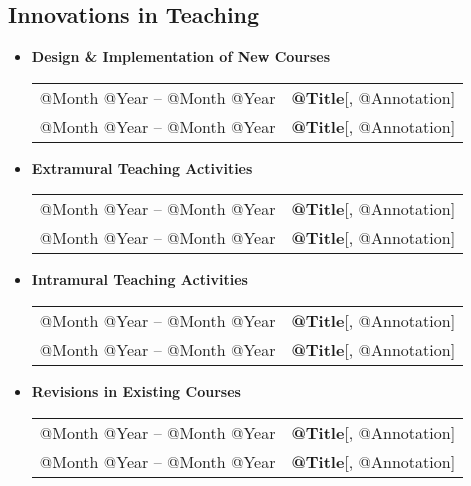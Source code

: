 \documentclass[10pt]{article}
\begin{document}
\begin{IOWA ONLY}
\subsection*{Innovations in Teaching}
\smallskip

\begin{itemize}
\item[] \textbf{Design \& Implementation of New Courses}
\\[1.3ex]
\begin{tabular}{l@{\quad\ }p{35em}} 
 @Month @Year -- @Month @Year
 & {\bf @Title}[, @Annotation]
 \\[.5ex]
 @Month @Year -- @Month @Year
 & {\bf @Title}[, @Annotation]
 \\[.5ex]
\end{tabular}

\item[] \textbf{Extramural Teaching Activities}
\\[1.3ex]
\begin{tabular}{l@{\quad\ }p{35em}} 
 @Month @Year -- @Month @Year
 & {\bf @Title}[, @Annotation]
 \\[.5ex]
 @Month @Year -- @Month @Year
 & {\bf @Title}[, @Annotation]
 \\[.5ex]
\end{tabular}

\item[] \textbf{Intramural Teaching Activities}
\\[1.3ex]
\begin{tabular}{l@{\quad\ }p{35em}} 
 @Month @Year -- @Month @Year
 & {\bf @Title}[, @Annotation]
 \\[.5ex]
 @Month @Year -- @Month @Year
 & {\bf @Title}[, @Annotation]
 \\[.5ex]
\end{tabular}

\item[] \textbf{Revisions in Existing Courses}
\\[1.3ex]
\begin{tabular}{l@{\quad\ }p{35em}} 
 @Month @Year -- @Month @Year
 & {\bf @Title}[, @Annotation]
 \\[.5ex]
 @Month @Year -- @Month @Year
 & {\bf @Title}[, @Annotation]
 \\[.5ex]
\end{tabular}


\end{itemize}
\end{IOWA ONLY}
\end{document}
